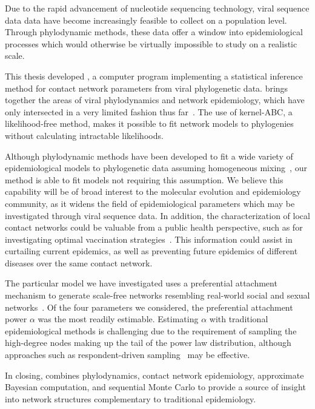 Due to the rapid advancement of nucleotide sequencing technology, viral
sequence data data have become increasingly feasible to collect on a population
level. Through phylodynamic methods, these data offer a window into
epidemiological processes which would otherwise be virtually impossible to
study on a realistic scale. 

This thesis developed , a computer program implementing a
statistical inference method for contact network parameters from viral
phylogenetic data.  brings together the areas of viral
phylodynamics and network epidemiology, which have only intersected in a very
limited fashion thus far~\autocite{welch2011statistical}. The use of
kernel-\gls{ABC}, a likelihood-free method, makes it possible to fit network
models to phylogenies without calculating intractable likelihoods.

Although phylodynamic methods have been developed to fit a wide variety of
epidemiological models to phylogenetic data assuming homogeneous
mixing~\autocite{volz2012complex, rasmussen2014phylodynamic}, our method is
able to fit models not requiring this assumption. We believe this capability
will be of broad interest to the molecular evolution and epidemiology
community, as it widens the field of epidemiological parameters which may be
investigated through viral sequence data. In addition, the characterization of
local contact networks could be valuable from a public health perspective, such
as for investigating optimal vaccination
strategies~\autocite{keeling2005networks, peng2013vaccination,
ma2013importance, rushmore2014network}. This information could assist in
curtailing current epidemics, as well as preventing future epidemics of
different diseases over the same contact network.

{\color{blue}
The particular model we have investigated uses a preferential attachment
mechanism to generate scale-free networks resembling real-world social and
sexual networks~\autocite{liljeros2001web, schneeberger2004scale,
colgate1989risk}. Of the four parameters we considered, the preferential
attachment power $\alpha$ was the most readily estimable. Estimating $\alpha$
with traditional epidemiological methods is challenging due to the requirement
of sampling the high-degree nodes making up the tail of the power law
distribution, although approaches such as respondent-driven
sampling~\autocite{heckathorn1997respondent} may be effective. 

In closing,  combines phylodynamics, contact network
epidemiology, approximate Bayesian computation, and sequential Monte Carlo 
to provide a source of insight into network structures complementary to
traditional epidemiology.
}
